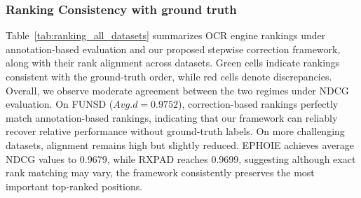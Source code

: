 \documentclass[11pt]{article}
\begin{document}
\subsubsection{Ranking Consistency with ground truth} 

Table~\ref{tab:ranking_all_datasets} summarizes OCR engine rankings under annotation-based evaluation and our proposed stepwise correction framework, along with their rank alignment across datasets. Green cells indicate rankings consistent with the ground-truth order, while red cells denote discrepancies.
%
Overall, we observe moderate agreement between the two regimes under NDCG evaluation. On FUNSD ($Avg.d=0.9752$), correction-based rankings perfectly match annotation-based rankings, indicating that our framework can reliably recover relative performance without ground-truth labels. On more challenging datasets, alignment remains high but slightly reduced. EPHOIE achieves average NDCG values to 0.9679, while RXPAD reaches 0.9699, suggesting although exact rank matching may vary, the framework consistently preserves the most important top-ranked positions. 
\end{document}
